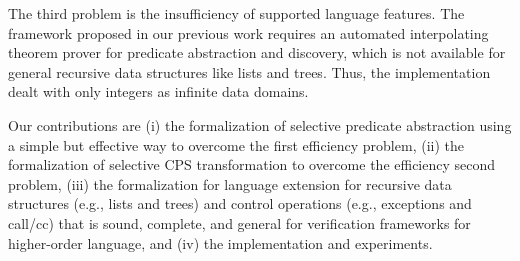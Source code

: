 %


%
%

The third problem is the insufficiency of supported language features.
The framework proposed in our previous work
requires an automated interpolating theorem prover for predicate
abstraction and discovery, which is not available for general recursive
data structures like lists and trees. Thus, the implementation dealt
with only integers as infinite data domains.

Our contributions are (i) the formalization of selective predicate
abstraction using a simple but effective way to overcome the first
efficiency problem, (ii) the formalization of selective CPS
transformation to overcome the efficiency second problem, (iii) the
formalization for language extension for recursive data structures
(e.g., lists and trees) and control operations (e.g., exceptions and
call/cc) that is sound, complete, and general for verification
frameworks for higher-order language, and (iv) the implementation and
experiments.

